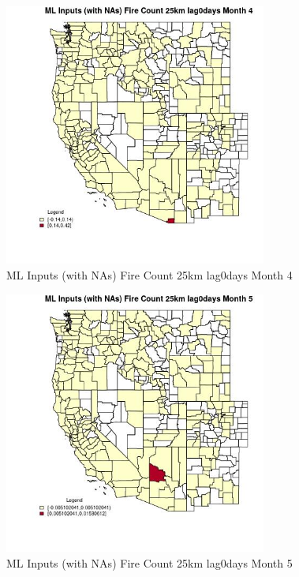 \begin{figure} 
\centering  
\includegraphics[width=0.77\textwidth]{Code_Outputs/Report_ML_input_PM25_Step4_part_e_de_duplicated_aves_compiled_2019-05-20wNAs_CountyFire_Count_25km_lag0daysmedianMonth4.jpg} 
\caption{\label{fig:Report_ML_input_PM25_Step4_part_e_de_duplicated_aves_compiled_2019-05-20wNAsCountyFire_Count_25km_lag0daysmedianMonth4}ML Inputs (with NAs) Fire Count 25km lag0days Month 4} 
\end{figure} 
 

\begin{figure} 
\centering  
\includegraphics[width=0.77\textwidth]{Code_Outputs/Report_ML_input_PM25_Step4_part_e_de_duplicated_aves_compiled_2019-05-20wNAs_CountyFire_Count_25km_lag0daysmedianMonth5.jpg} 
\caption{\label{fig:Report_ML_input_PM25_Step4_part_e_de_duplicated_aves_compiled_2019-05-20wNAsCountyFire_Count_25km_lag0daysmedianMonth5}ML Inputs (with NAs) Fire Count 25km lag0days Month 5} 
\end{figure} 
 


